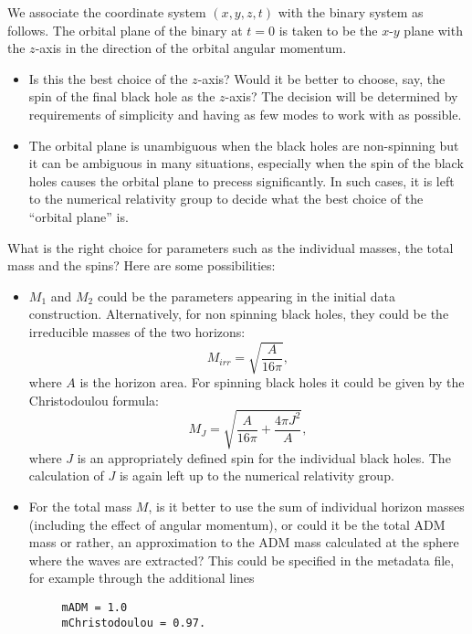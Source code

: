 \documentclass[prd,preprintnumbers,superscriptaddress,eqsecnum]{revtex4}
\numberwithin{equation}{section}
\begin{document}
We associate the coordinate system $(x,y,z,t)$ with the binary system
as follows. The orbital plane of the binary at $t=0$ is taken to be
the $x$-$y$ plane with the $z$-axis in the direction of the orbital
angular momentum.
\begin{itemize}
\item Is this the best choice of the $z$-axis?  Would it be better to
  choose, say, the spin of the final black hole as the $z$-axis? The
  decision will be determined by requirements of simplicity and
  having as few modes to work with as possible.
\item The orbital plane is unambiguous when the black holes are non-spinning
  but it can be ambiguous in many situations, especially when the spin
  of the black holes causes the orbital plane to precess significantly.
  In such cases, it is left to the numerical relativity group to decide
  what the best choice of the ``orbital plane'' is. 
\end{itemize}
What is the right choice for parameters such as the individual masses,
the total mass and the spins?  Here are some possibilities:
\begin{itemize}
\item $M_1$ and $M_2$ could be the parameters appearing in the initial
  data construction. Alternatively, for non spinning black holes,
  they could be the irreducible masses of the two horizons:
  \begin{equation}
    \label{eq:12}
    M_{irr} = \sqrt{\frac{A}{16\pi}},
  \end{equation}
  where $A$ is the horizon area. For spinning black holes it could be
  given by the Christodoulou formula:
  \begin{equation}
    \label{eq:13}
    M_{J} = \sqrt{\frac{A}{16\pi} + \frac{4\pi J^2}{A}},
  \end{equation}
  where $J$ is an appropriately defined spin for the individual black
  holes. The calculation of $J$ is again left up to the numerical
  relativity group.
\item For the total mass $M$, is it better to use the sum of individual
  horizon masses (including the effect of angular momentum), or could
  it be the total ADM mass or rather, an approximation to the ADM mass
  calculated at the sphere where the waves are extracted? This could
  be specified in the metadata file, for example through the additional lines
  \begin{verbatim}
     mADM = 1.0
     mChristodoulou = 0.97.
  \end{verbatim}
\end{itemize}
\end{document}
